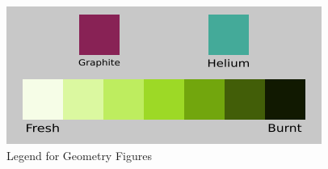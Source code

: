 \begin{figure}[H]
\centering
\includegraphics[width=0.6\linewidth]{figures/geom-legend}
\caption{Legend for Geometry Figures}
\label{fig:geom-legend}
\end{figure}